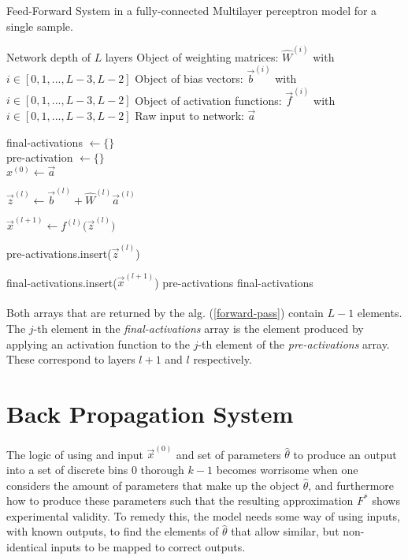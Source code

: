 \documentclass[12pt,letterpaper]{article}
\begin{document}
\begin{algorithm}
\label{forward-pass}
\caption{Feed-Forward System in a fully-connected Multilayer perceptron model for a single sample.}
\begin{algorithmic}

\REQUIRE Network depth of $L$ layers
\REQUIRE Object of weighting matrices: $\hat{W}^{(i)}$ with $i \in [0,1,...,L-3,L-2]$
\REQUIRE Object of bias vectors: $\vec{b}^{(i)}$ with $i \in [0,1,...,L-3,L-2]$
\REQUIRE Object of activation functions: $\vec{f}^{(i)}$ with $i \in [0,1,...,L-3,L-2]$
\REQUIRE Raw input to network: $\vec{a}$

final-activations $\leftarrow \{\}$ \\
pre-activation $\leftarrow \{\}$	\\
$x^{(0)} \leftarrow \vec{a}$ 		\\

\item $\vec{z}^{(l)} \leftarrow \vec{b}^{(l)} + \hat{W}^{(l)} \vec{a}^{(l)}$
\item $\vec{x}^{(l+1)} \leftarrow f^{(l)} \big( \vec{z}^{(l)} \big)$
\item pre-activations.insert($\vec{z}^{(l)}$)
\item final-activations.insert($\vec{x}^{(l+1)}$)
\ENDFOR
\RETURN pre-activations
\RETURN final-activations
\end{algorithmic}
\end{algorithm}

\paragraph*{}Both arrays  that are returned by the alg. (\ref{forward-pass}) contain $L-1$ elements. The $j$-th element in the \textit{final-activations} array is the element produced by applying an activation function to the $j$-th element of the \textit{pre-activations} array. These correspond to layers $l+1$ and $l$ respectively.


\section*{Back Propagation System}

\paragraph*{}The logic of using and input $\vec{x}^{(0)}$ and set of parameters $\hat{\theta}$ to produce an output into a set of discrete bins $0$ thorough $k-1$ becomes worrisome when one considers the amount of parameters that make up the object $\hat{\theta}$, and furthermore how to produce these parameters such that the resulting approximation $F^*$ shows experimental validity. To remedy this, the model needs some way of using inputs, with known outputs, to find the elements of $\hat{\theta}$ that allow similar, but non-identical inputs to be mapped to correct outputs. 
\end{document}
